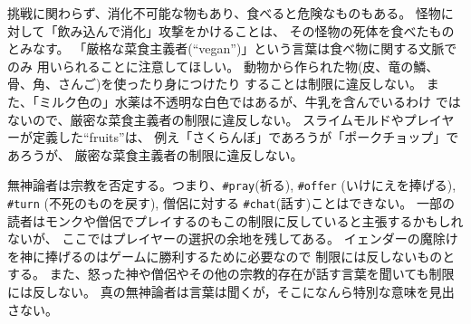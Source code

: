 挑戦に関わらず、消化不可能な物もあり、食べると危険なものもある。
怪物に対して「飲み込んで消化」攻撃をかけることは、
その怪物の死体を食べたものとみなす。
「厳格な菜食主義者(``vegan'')」という言葉は食べ物に関する文脈でのみ
用いられることに注意してほしい。
動物から作られた物(皮、竜の鱗、骨、角、さんご)を使ったり身につけたり
することは制限に違反しない。
また、「ミルク色の」水薬は不透明な白色ではあるが、牛乳を含んでいるわけ
ではないので、厳密な菜食主義者の制限に違反しない。
スライムモルドやプレイヤーが定義した``fruits''は、
例え「さくらんぼ」であろうが「ポークチョップ」であろうが、
厳密な菜食主義者の制限に違反しない。

無神論者は宗教を否定する。つまり、{\tt \#pray}(祈る), {\tt \#offer}
(いけにえを捧げる),
{\tt \#turn} (不死のものを戻す), 僧侶に対する {\tt \#chat}(話す)ことはできない。
一部の読者はモンクや僧侶でプレイするのもこの制限に反していると主張するかもしれないが、
ここではプレイヤーの選択の余地を残してある。
イェンダーの魔除けを神に捧げるのはゲームに勝利するために必要なので
制限には反しないものとする。
また、怒った神や僧侶やその他の宗教的存在が話す言葉を聞いても制限には反しない。
真の無神論者は言葉は聞くが，そこになんら特別な意味を見出さない。

